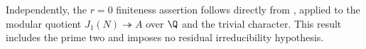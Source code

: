 Independently, the $r=0$ finiteness
assertion follows directly from \cite[Corollary 14.3]{kato},
applied to the modular quotient $J_1(N)\twoheadrightarrow A$
over $\Q$ and the trivial character. This result includes the
prime two and imposes no residual irreducibility hypothesis.
